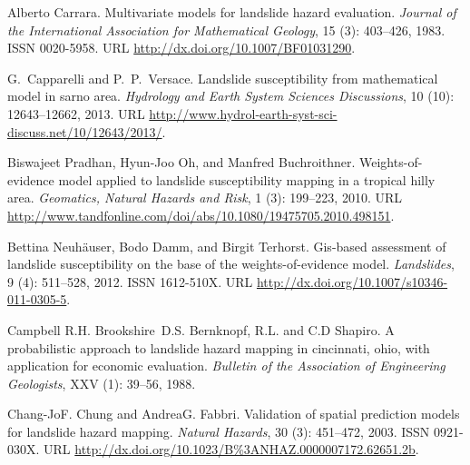 \documentclass[11pt,twoside]{rmta2010esp}%
\begin{document}
\begin{thebibliography}{99}


Alberto Carrara.
\newblock Multivariate models for landslide hazard evaluation.
\newblock \emph{Journal of the International Association for Mathematical
  Geology}, 15 (3): 403--426, 1983.
\newblock ISSN 0020-5958.
\newblock URL \url{http://dx.doi.org/10.1007/BF01031290}.


G.~Capparelli and P.~P.~Versace.
\newblock Landslide susceptibility from mathematical model in sarno area.
\newblock \emph{Hydrology and Earth System Sciences Discussions}, 10
  (10): 12643--12662, 2013.
\newblock URL
  \url{http://www.hydrol-earth-syst-sci-discuss.net/10/12643/2013/}.


Biswajeet Pradhan, Hyun-Joo Oh, and Manfred Buchroithner.
\newblock Weights-of-evidence model applied to landslide susceptibility mapping
  in a tropical hilly area.
\newblock \emph{Geomatics, Natural Hazards and Risk}, 1 (3):
  199--223, 2010.
\newblock URL
  \url{http://www.tandfonline.com/doi/abs/10.1080/19475705.2010.498151}.
  
  
Bettina Neuhäuser, Bodo Damm, and Birgit Terhorst.
\newblock Gis-based assessment of landslide susceptibility on the base of the
  weights-of-evidence model.
\newblock \emph{Landslides}, 9 (4): 511--528, 2012.
\newblock ISSN 1612-510X.
\newblock URL \url{http://dx.doi.org/10.1007/s10346-011-0305-5}.



Campbell R.H. Brookshire~D.S. Bernknopf, R.L. and C.D Shapiro.
\newblock A probabilistic approach to landslide hazard mapping in cincinnati,
  ohio, with application for economic evaluation.
\newblock \emph{Bulletin of the Association of Engineering Geologists},
  XXV (1): 39--56, 1988.
  
  
Chang-JoF. Chung and AndreaG. Fabbri.
\newblock Validation of spatial prediction models for landslide hazard mapping.
\newblock \emph{Natural Hazards}, 30 (3): 451--472, 2003.
\newblock ISSN 0921-030X.
\newblock URL \url{http://dx.doi.org/10.1023/B\%3ANHAZ.0000007172.62651.2b}.  


\end{thebibliography}
\end{document}

